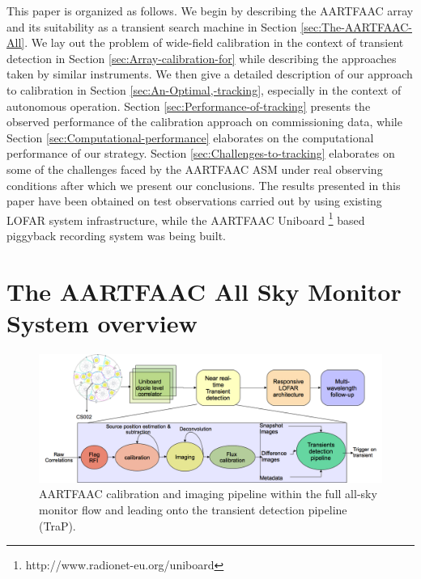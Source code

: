 \documentclass{aa}
\begin{document}
This paper is  organized as follows.  We begin by  describing the AARTFAAC array
and   its    suitability   as   a   transient   search    machine   in   Section
\ref{sec:The-AARTFAAC-All}. We lay out  the problem of wide-field calibration in
the  context of transient  detection in  Section \ref{sec:Array-calibration-for}
while describing  the approaches taken by  similar instruments.  We  then give a
detailed   description    of   our   approach   to    calibration   in   Section
\ref{sec:An-Optimal,-tracking},   especially  in   the  context   of  autonomous
operation.   Section  \ref{sec:Performance-of-tracking}  presents  the  observed
performance  of the calibration  approach on  commissioning data,  while Section
\ref{sec:Computational-performance} elaborates  on the computational performance
of our strategy.  Section \ref{sec:Challenges-to-tracking} elaborates on some of
the challenges faced  by the AARTFAAC ASM under  real observing conditions after
which we present our conclusions. The  results presented in this paper have been
obtained  on  test observations  carried  out  by  using existing  LOFAR  system
infrastructure,                 while                the                AARTFAAC
Uniboard    \footnote{http://www.radionet-eu.org/uniboard}    based    piggyback
recording system was being built.


\section{\label{sec:The-AARTFAAC-All}The AARTFAAC All Sky Monitor System
overview} 

\begin{figure}[htbp]
\centering
\includegraphics[width=1\textwidth]{Figs/AFAAC_blkdia_latest.png}
\caption{AARTFAAC  calibration  and imaging  pipeline  within  the full  all-sky
  monitor flow and leading onto the transient detection pipeline (TraP).}
\label{fig:The-AARTFAAC-calibration}
\end{figure}
\end{document}
